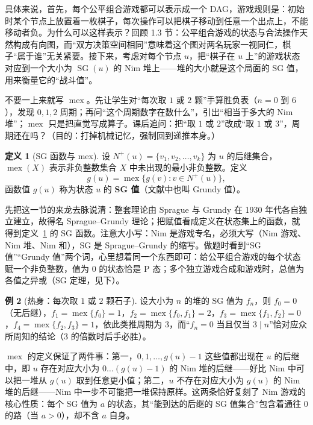 \documentclass[UTF8,a4paper,11pt,oneside,openany,fontset=fandol]{ctexbook}
\theoremstyle{definition}
\newtheorem{definition}{定义}[chapter]
\newtheorem{example}[definition]{例}
\newcommand{\mex}{\operatorname{mex}}
\newcommand{\SG}{\operatorname{SG}}
\newcommand{\Np}{N^+}
\begin{document}
具体来说，首先，每个公平组合游戏都可以表示成一个 DAG，游戏规则是：初始时某个节点上放置着一枚棋子，每次操作可以把棋子移动到任意一个出点上，不能移动者负。为什么可以这样表示？回顾 1.3 节：公平组合游戏的状态与合法操作天然构成有向图，而“双方决策空间相同”意味着这个图对两名玩家一视同仁，棋子“属于谁”无关紧要。接下来，考虑对每个节点 $u$，把“棋子在 $u$ 上”的游戏状态对应到一个大小为 $\SG(u)$ 的 Nim 堆上——堆的大小就是这个局面的 SG 值，用来衡量它的“战斗值”。

\begin{teach}[怎样想到 SG 值？]
不要一上来就写 $\operatorname{mex}$。先让学生对“每次取 $1$ 或 $2$ 颗”手算胜负表（$n=0$ 到 $6$），发现 $0,1,2$ 周期；再问“这个周期数字在数什么”，引出“相当于多大的 Nim 堆”；$\operatorname{mex}$ 只是把直觉写成算子。课后追问：把“取 $1$ 或 $2$”改成“取 $1$ 或 $3$”，周期还在吗？（目的：打掉机械记忆，强制回到递推本身。）
\end{teach}
\begin{definition}[SG 函数与 mex]\label{def:sg}
设 $\Np(u)=\{v_1,v_2,\ldots,v_k\}$ 为 $u$ 的后继集合，$\mex(X)$ 表示非负整数集合 $X$ 中未出现的最小非负整数。定义
\[
 g(u)=\mex\{g(v):v\in\Np(u)\},
\]
函数值 $g(u)$ 称为状态 $u$ 的 \textbf{SG 值}（文献中也叫 Grundy 值）。
\end{definition}

先把这一节的来龙去脉说清：整套理论由 Sprague 与 Grundy 在 1930 年代各自独立建立，故得名 Sprague--Grundy 理论；把赋值看成定义在状态集上的函数，就得到定义~\ref{def:sg} 的 SG 函数。注意大小写：Nim 是游戏专名，必须大写（Nim 游戏、Nim 堆、Nim 和），SG 是 Sprague--Grundy 的缩写。做题时看到“SG 值”“Grundy 值”两个词，心里想着同一个东西即可：给公平组合游戏的每个状态赋一个非负整数，值为 $0$ 的状态恰是 P 态；多个独立游戏合成和游戏时，总值为各值之异或（SG 定理，见下）。

\begin{example}[热身：每次取 $1$ 或 $2$ 颗石子]
设大小为 $n$ 的堆的 SG 值为 $f_n$，则 $f_0=0$（无后继），$f_1=\mex\{f_0\}=1$，$f_2=\mex\{f_0,f_1\}=2$，$f_3=\mex\{f_1,f_2\}=0$，$f_4=\mex\{f_2,f_3\}=1$，依此类推周期为 $3$，而“$f_n=0$ 当且仅当 $3\mid n$”恰对应众所周知的结论（$3$ 的倍数时后手必胜）。
\end{example}

$\mex$ 的定义保证了两件事：第一，$0,1,\ldots,g(u)-1$ 这些值都出现在 $u$ 的后继中，即 $u$ 存在对应大小为 $0\ldots(g(u)-1)$ 的 Nim 堆的后继——好比 Nim 中可以把一堆从 $g(u)$ 取到任意更小值；第二，$u$ 不存在对应大小为 $g(u)$ 的 Nim 堆的后继——Nim 中一步不可能把一堆保持原样。这两条恰好复刻了 Nim 游戏的核心性质：每个 SG 值为 $a$ 的状态，其“能到达的后继的 SG 值集合”包含着通往 $0$ 的路（当 $a>0$），却不含 $a$ 自身。
\end{document}
